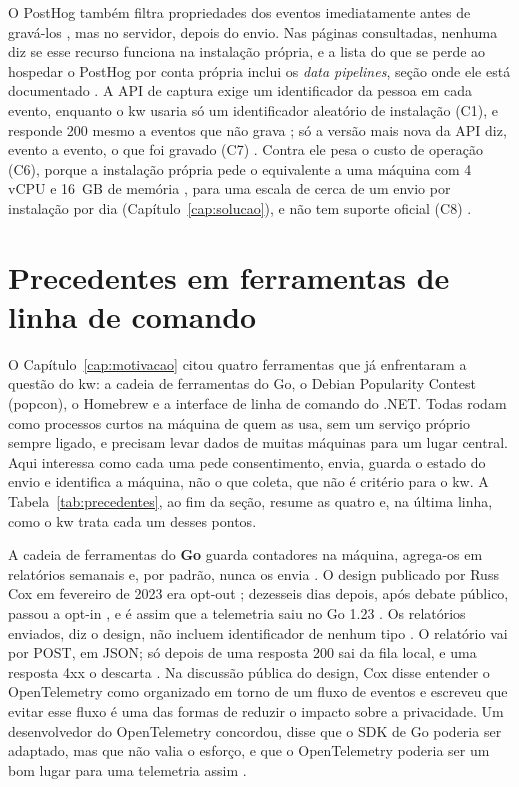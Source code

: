 O PostHog também filtra propriedades dos eventos
imediatamente antes de gravá-los \citep{posthog_realtime_transformations}, mas
no servidor, depois do envio. Nas páginas consultadas, nenhuma diz se esse
recurso funciona na instalação própria, e a lista do que se perde ao hospedar
o PostHog por conta própria inclui os \textit{data pipelines}, seção onde ele
está documentado \citep{posthog_selfhost_disclaimer}. A API de captura exige
um identificador da pessoa em cada evento, enquanto o kw usaria só um
identificador aleatório de instalação (C1), e responde 200 mesmo a eventos que
não grava \citep{posthog_capture}; só a versão mais nova da API diz, evento a
evento, o que foi gravado (C7) \citep{posthog_capture_v1}. Contra ele pesa o custo
de operação (C6), porque a instalação própria pede o equivalente a uma máquina com
4 vCPU e 16~GB de memória \citep{posthog_selfhost}, para uma escala de cerca
de um envio por instalação por dia (Capítulo~\ref{cap:solucao}), e não tem
suporte oficial (C8) \citep{posthog_selfhost}.



\section{Precedentes em ferramentas de linha de comando}
\label{sec:precedentes}

O Capítulo~\ref{cap:motivacao} citou quatro ferramentas que já enfrentaram a
questão do kw: a cadeia de ferramentas do Go, o Debian Popularity Contest
(popcon), o Homebrew e a interface de linha de comando do .NET. Todas rodam
como processos curtos na máquina de quem as usa, sem um serviço próprio sempre
ligado, e precisam levar dados de muitas máquinas para um lugar central. Aqui
interessa como cada uma pede consentimento, envia, guarda o estado do envio e
identifica a máquina, não o que coleta, que não é critério para o kw. A
Tabela~\ref{tab:precedentes}, ao fim da seção, resume as quatro e, na última
linha, como o kw trata cada um desses pontos.

A cadeia de ferramentas do \textbf{Go} guarda contadores na máquina,
agrega-os em relatórios semanais e, por padrão, nunca os envia
\citep{go_telemetry_doc}. O design
publicado por Russ Cox em fevereiro de 2023 era opt-out
\citep{cox_telemetry_design_2023}; dezesseis dias depois, após debate público,
passou a opt-in \citep{coxsw2023optin}, e é assim que a telemetria saiu no
Go 1.23 \citep{go_release_1_23}. Os relatórios enviados, diz o design, não
incluem identificador de nenhum tipo
\citep{cox_telemetry_design_2023}. O relatório vai por POST, em JSON; só
depois de uma resposta 200 sai da fila local, e uma resposta 4xx o descarta
\citep{golang_telemetry}. Na discussão pública do design, Cox disse entender
o OpenTelemetry como organizado em torno de um fluxo de eventos e escreveu
que evitar esse fluxo é uma das formas de reduzir o impacto sobre a
privacidade. Um desenvolvedor do OpenTelemetry concordou, disse que o SDK de
Go poderia ser adaptado, mas que não valia o esforço, e que o OpenTelemetry
poderia ser um bom lugar para uma telemetria assim
\citep{go_discussion_58409}.

